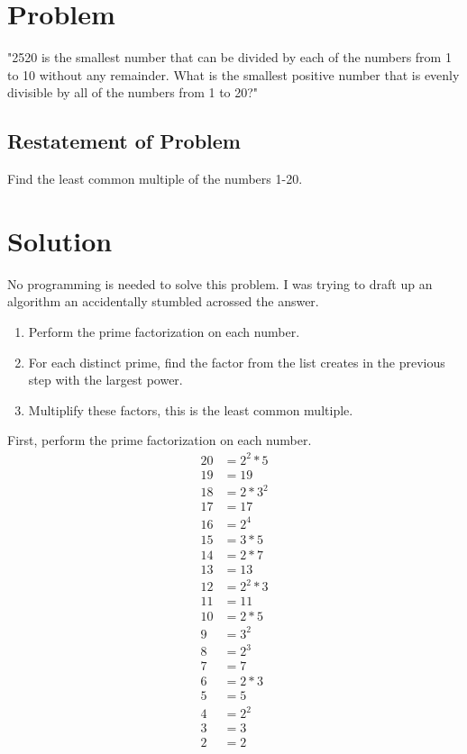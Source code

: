 \documentclass[a4paper, 12pt]{article}
\begin{document}
\section{Problem}
"2520 is the smallest number that can be divided by each of the numbers from 
1 to 10 without any remainder.
What is the smallest positive number that is evenly divisible by all of the 
numbers from 1 to 20?"

\subsection{Restatement of Problem}
Find the least common multiple of the numbers 1-20.

\section{Solution}
No programming is needed to solve this problem.  I was trying to draft up 
an algorithm an accidentally stumbled acrossed the answer.

\begin{enumerate}
\item Perform the prime factorization on each number.
\item For each distinct prime, find the factor from the list creates in the
previous step with the largest power.
\item Multiplify these factors, this is the least common multiple.
\end{enumerate}

First, perform the prime factorization on each number.
\begin{align*} 
20 &= 2^2 * 5 \\
19 &= 19 \\
18 &= 2 * 3^2 \\
17 &= 17 \\
16 &= 2^4 \\
15 &= 3 * 5 \\
14 &= 2 * 7 \\
13 &= 13 \\
12 &= 2^2 * 3 \\
11 &= 11 \\
10 &= 2 * 5 \\
9 &= 3^2 \\
8 &= 2^3 \\
7 &= 7 \\
6 &= 2 * 3 \\
5 &= 5 \\
4 &= 2^2 \\
3 &= 3 \\
2 &= 2 
\end{align*}
\end{document}
